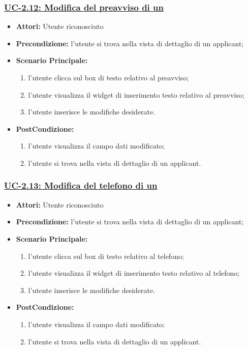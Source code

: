 \subsubsection{\underline{UC-2.12: Modifica del preavviso di un \applicant}}
\begin{itemize}
	\item \textbf{Attori:} Utente riconosciuto
	\item \textbf{Precondizione:}  l'utente si trova nella vista di dettaglio di un applicant;
	\item \textbf{Scenario Principale:}
	\begin{enumerate}
		\item l'utente clicca sul box di testo relativo al preavviso;
		\item l'utente visualizza il  widget di inserimento testo relativo al preavviso;
		\item l'utente inserisce le modifiche desiderate.
	\end{enumerate}
	\item \textbf{PostCondizione:} 
	\begin{enumerate}
		\item l'utente visualizza il campo dati modificato;
		\item l'utente si trova nella vista di dettaglio di un applicant.
	\end{enumerate}
	
\end{itemize}

\subsubsection{\underline{UC-2.13: Modifica del telefono di un \applicant}}
\begin{itemize}
	\item \textbf{Attori:} Utente riconosciuto
	\item \textbf{Precondizione:}  l'utente si trova nella vista di dettaglio di un applicant;
	\item \textbf{Scenario Principale:}
	\begin{enumerate}
		\item l'utente clicca sul box di testo relativo al telefono;
		\item l'utente visualizza il  widget di inserimento testo relativo al telefono;
		\item l'utente inserisce le modifiche desiderate.
	\end{enumerate}
	\item \textbf{PostCondizione:} 
	\begin{enumerate}
		\item l'utente visualizza il campo dati modificato;
		\item l'utente si trova nella vista di dettaglio di un applicant.
	\end{enumerate}
	
\end{itemize}


